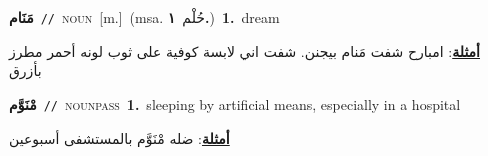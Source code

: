 \documentclass[10pt,a4paper,twoside]{article} %
\begin{document}
\begin{multicols}{2}
{\setlength\topsep{0pt}\textbf{\foreignlanguage{arabic}{مَنَام}}\ {\color{gray}\texttt{//}\color{black}}\ \textsc{noun}\ [m.]\ \color{gray}(msa. \foreignlanguage{arabic}{حُلْم}~\foreignlanguage{arabic}{\textbf{١.}})\color{black}\ \textbf{1.}~dream\  \begin{flushright}\color{gray}\foreignlanguage{arabic}{\textbf{\underline{\foreignlanguage{arabic}{أمثلة}}}: امبارح شفت مَنام بيجنن. شفت اني لابسة كوفية على ثوب لونه أحمر مطرز بأزرق}\end{flushright}\color{black}} \vspace{2mm}

{\setlength\topsep{0pt}\textbf{\foreignlanguage{arabic}{مْنَوَّم}}\ {\color{gray}\texttt{//}\color{black}}\ \textsc{noun\textunderscore pass}\ \textbf{1.}~sleeping by artificial means, especially in a hospital\  \begin{flushright}\color{gray}\foreignlanguage{arabic}{\textbf{\underline{\foreignlanguage{arabic}{أمثلة}}}: ضله مْنَوَّم بالمستشفى أسبوعين}\end{flushright}\color{black}} \vspace{2mm}


\end{multicols}
\end{document}

